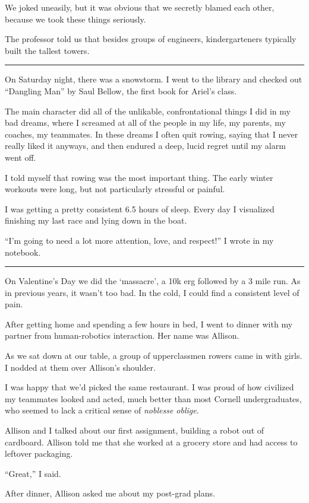 We joked uneasily, but it was obvious that we secretly blamed each other,
because we took these things seriously.

The professor told us that besides groups of engineers, kindergarteners
typically built the tallest towers.

\plainfancybreak{12pt}{2}{}

On Saturday night, there was a snowstorm.  I went to the library and checked out
``Dangling Man'' by Saul Bellow, the first book for Ariel's class.

The main character did all of the unlikable, confrontational things I did in my
bad dreams, where I screamed at all of the people in my life, my parents, my
coaches, my teammates.  In these dreams I often quit rowing, saying that I never
really liked it anyways, and then endured a deep, lucid regret until my alarm
went off.

I told myself that rowing was the most important thing.  The early winter
workouts were long, but not particularly stressful or painful.

I was getting a pretty consistent 6.5 hours of sleep.  Every day I visualized
finishing my last race and lying down in the boat.

``I'm going to need a lot more attention, love, and respect!'' I wrote in my
notebook.

\plainfancybreak{12pt}{2}{}

On Valentine's Day we did the `massacre', a 10k erg followed by a 3 mile run.
As in previous years, it wasn't too bad.  In the cold, I could find a consistent
level of pain.

After getting home and spending a few hours in bed, I went to dinner with my
partner from human-robotics interaction.  Her name was Allison.

As we sat down at our table, a group of upperclassmen rowers came in with girls.
I nodded at them over Allison's shoulder.

I was happy that we'd picked the same restaurant.  I was proud of how civilized
my teammates looked and acted, much better than most Cornell undergraduates, who
seemed to lack a critical sense of \textit{noblesse oblige}.

Allison and I talked about our first assignment, building a robot out of
cardboard.  Allison told me that she worked at a grocery store and had access to
leftover packaging.

``Great,'' I said.

After dinner, Allison asked me about my post-grad plans.

